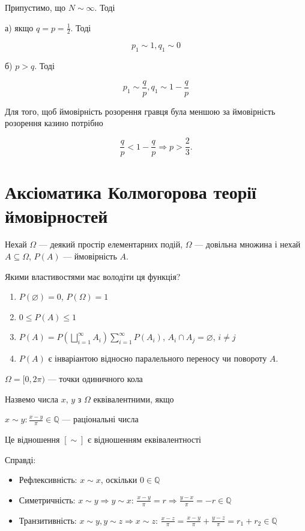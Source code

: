 \begin{example}
    Припустимо, що $N \sim \infty$. Тоді 
    
    а) якщо $q = p = \frac{1}{2}$. Тоді
    
    $$p_1 \sim 1, q_1 \sim 0$$
    
    б) $p > q$. Тоді
    
    $$p_1 \sim \frac{q}{p}, q_1 \sim 1 - \frac{q}{p}$$
    
    Для того, щоб ймовірність розорення гравця була меншою
    за ймовірність розорення казино потрібно 
    
    $$\frac{q}{p} < 1 - \frac{q}{p} \Rightarrow p > \frac{2}{3}.$$
\end{example}

\section{Аксіоматика Колмогорова теорії ймовірностей}

Нехай $\Omega$ --- деякий простір елементарних подій, 
$\Omega$ --- довільна множина і нехай $A \subseteq \Omega$, $P(A)$ --- ймовірність $A$.

Якими властивостями має володіти ця функція?

\begin{enumerate}
    \item $P(\varnothing) = 0$, $P(\Omega) = 1$
    \item $0 \leqslant P(A) \leqslant 1$
    \item $P(A) = P(\bigsqcup\limits_{i=1}^{\infty} A_i)
        \sum\limits_{i=1}^{\infty} P(A_i)$,
        $A_i \cap A_j = \varnothing$, $i \neq j$
    \item $P(A)$ є інваріантою відносно паралельного переносу чи повороту $A$.
    \beautifulImage
\end{enumerate}

\begin{example}
    $\Omega = [0, 2 \pi)$ --- точки одиничного кола
    
    \beautifulImage

    Назвемо числа $x$, $y$ з $\Omega$ еквівалентними, якщо

    $x \sim y: \frac{x-y}{\pi} \in \mathbb{Q} \text{ --- раціональні числа}$
    
    Це відношення $[\sim]$ є відношенням еквівалентності
\end{example}

Справді:
\begin{itemize}
    \item Рефлексивність: $x \sim x$, оскільки $0 \in \mathbb{Q}$
    \item Симетричність: $x \sim y \Rightarrow y \sim x$:
        $\frac{x-y}{\pi} = r \Rightarrow \frac{y - x}{\pi} = -r \in \mathbb{Q}$
    \item Транзитивність: $x \sim y, y \sim z \Rightarrow x \sim z$:
        $\frac{x-z}{\pi} = \frac{x-y}{\pi}  +\frac{y-z}{\pi} = r_1 + r_2 \in \mathbb{Q}$
\end{itemize}

